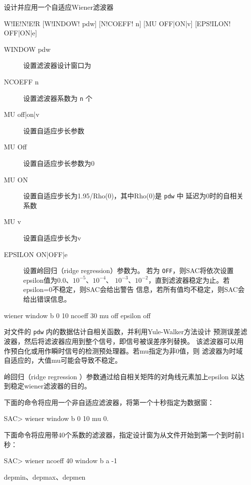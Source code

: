 \label{cmd:wiener}

设计并应用一个自适应Wiener滤波器

\begin{SACSTX}
W!IE!N!E!R [W!INDOW! pdw] [N!COEFF! n] [MU OFF|ON|v] [EPS!ILON! OFF|ON|e]
\end{SACSTX}

\begin{description}
\item [WINDOW pdw] 设置滤波器设计窗口为 
\item [NCOEFF n] 设置滤波器系数为 \texttt{n} 个
\item [MU off|on|v] 设置自适应步长参数
\item [MU Off] 设置自适应步长参数为0
\item [MU ON] 设置自适应步长为1.95/Rho(0)，其中Rho(0)是 \texttt{pdw} 中
    延迟为0时的自相关系数
\item [MU v] 设置自适应步长为v
\item [EPSILON ON|OFF|e] 设置岭回归（ridge regression）参数为。
    若为 \texttt{OFF}，则SAC将依次设置epsilon值为0.0、$10^{-5}$、$10^{-4}$、
    $10^{-3}$、$10^{-2}$，直到滤波器稳定为止。若epsilon=0不稳定，则SAC会给出警告
    信息，若所有值均不稳定，则SAC会给出错误信息。
\end{description}

\begin{SACDFT}
wiener window b 0 10 ncoeff 30 mu off epsilon off
\end{SACDFT}

对文件的 \texttt{pdw} 内的数据估计自相关函数，并利用Yule-Walker方法设计
预测误差滤波器，然后将滤波器应用到整个信号，即信号被误差序列替换。
该滤波器可以用作预白化或用作瞬时信号的检测预处理器。若mu指定为非0值，则
滤波器为时域自适应的，大值mu可能会导致不稳定。

岭回归（ridge regression ）参数通过给自相关矩阵的对角线元素加上epsilon
以达到稳定wiener滤波器的目的。

下面的命令将应用一个非自适应滤波器，将第一个十秒指定为数据窗：
\begin{SACCode}
SAC> wiener window b 0 10 mu 0.
\end{SACCode}

下面命令将应用带40个系数的滤波器，指定设计窗为从文件开始到第一个到时前1秒：
\begin{SACCode}
SAC> wiener ncoeff 40 window b a -1
\end{SACCode}

depmin、depmax、depmen
